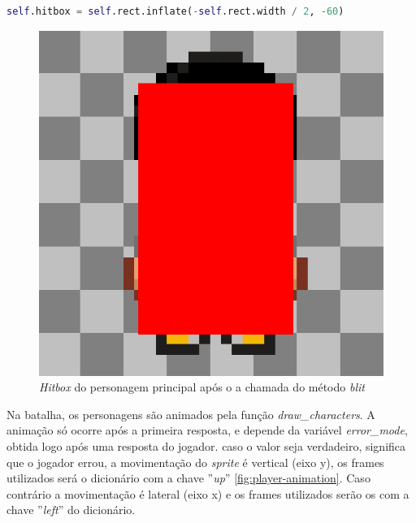 \begin{lstlisting}[language=Python,breaklines, caption= Uso da Função \textit{inflate}, label= lst-player-hitbox]
self.hitbox = self.rect.inflate(-self.rect.width / 2, -60)
\end{lstlisting}
\begin{figure}[h!]
    \centering
    \includegraphics[width=0.7\linewidth]{figuras/player-hitbox.png}
    \caption{\textit{Hitbox} do personagem principal após o a chamada do método \textit{blit}}
    \label{fig:player-hitbox}
\end{figure}

\clearpage
Na batalha, os personagens são animados pela função \textit{draw\_characters}. A animação só ocorre após a primeira resposta, e depende da variável \textit{error\_mode}, obtida logo após uma resposta do jogador. caso o valor seja verdadeiro, significa que o jogador errou, a movimentação do \textit{sprite} é vertical (eixo y), os frames utilizados será o dicionário com a chave ''\textit{up}'' \ref{fig:player-animation}. Caso contrário a movimentação é lateral (eixo x) e os frames utilizados serão os com a chave ''\textit{left}'' do dicionário.


